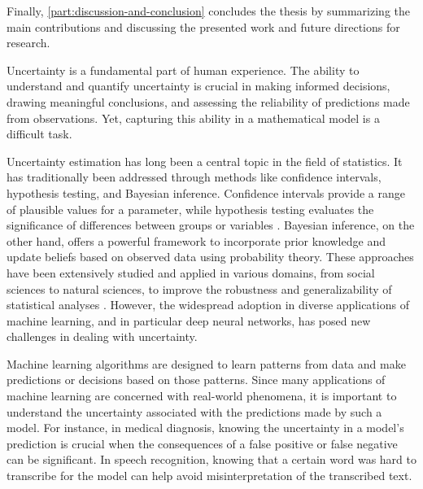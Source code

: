 Finally, \cref{part:discussion-and-conclusion} concludes the thesis by summarizing the main contributions and discussing the presented work and future directions for research.



















\iffalse


Uncertainty is a fundamental part of human experience. The ability to understand and quantify uncertainty is crucial in making informed decisions, drawing meaningful conclusions, and assessing the reliability of predictions made from observations. Yet, capturing this ability in a mathematical model is a difficult task. 

Uncertainty estimation has long been a central topic in the field of statistics. It has traditionally been addressed through methods like confidence intervals, hypothesis testing, and Bayesian inference. Confidence intervals provide a range of plausible values for a parameter, while hypothesis testing evaluates the significance of differences between groups or variables \cite{blitzstein_introduction_2019}. Bayesian inference, on the other hand, offers a powerful framework to incorporate prior knowledge and update beliefs based on observed data using probability theory. These approaches have been extensively studied and applied in various domains, from social sciences to natural sciences, to improve the robustness and generalizability of statistical analyses \cite{gelman_bayesian_2013}. However, the widespread adoption in diverse applications of machine learning, and in particular deep neural networks, has posed new challenges in dealing with uncertainty. 

Machine learning algorithms are designed to learn patterns from data and make predictions or decisions based on those patterns. Since many applications of machine learning are concerned with real-world phenomena, it is important to understand the uncertainty associated with the predictions made by such a model. For instance, in medical diagnosis, knowing the uncertainty in a model's prediction is crucial when the consequences of a false positive or false negative can be significant. In speech recognition, knowing that a certain word was hard to transcribe for the model can help avoid misinterpretation of the transcribed text.


